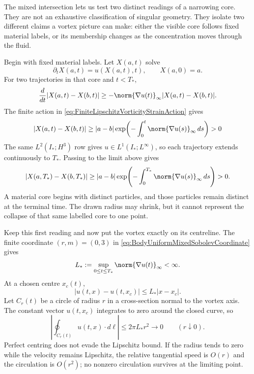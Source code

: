 The mixed intersection lets us test two distinct readings of a narrowing core.
They are not an exhaustive classification of singular geometry.
They isolate two different claims a vortex picture can make: either the visible core follows fixed material labels, or its membership changes as the concentration moves through the fluid.

Begin with fixed material labels.
Let \(X(a,t)\) solve
\[
  \partial_tX(a,t)=u(X(a,t),t),
  \qquad
  X(a,0)=a.
\]
For two trajectories in that core and \(t<T_*\),
\[
  \frac d{dt}|X(a,t)-X(b,t)|
  \geq
  -\norm{\nabla u(t)}_\infty|X(a,t)-X(b,t)|.
\]
The finite action in \eqref{eq:FiniteLipschitzVorticityStrainAction} gives
\begin{equation}\label{eq:BodyMaterialCoreLowerBound}
  |X(a,t)-X(b,t)|
  \geq
  |a-b|
  \exp\!\left(
    -\int_0^t\norm{\nabla u(s)}_\infty\,ds
  \right)
  >0
\end{equation}
The same \(L^2(I_*;H^3)\) row gives \(u\in L^1(I_*;L^\infty)\), so each trajectory
extends continuously to \(T_*\).  Passing to the limit above gives
\[
  |X(a,T_*)-X(b,T_*)|
  \geq |a-b|\exp\!\left(-\int_0^{T_*}\norm{\nabla u(s)}_\infty\,ds\right)>0.
\]
A material core begins with distinct particles, and those particles remain distinct at
the terminal time.  The drawn radius may shrink, but it cannot represent the collapse of
that same labelled core to one point.

Keep this first reading and now put the vortex exactly on its centreline.
The finite coordinate \((r,m)=(0,3)\) in \eqref{eq:BodyUniformMixedSobolevCoordinate} gives
\begin{equation}\label{eq:BodyUniformLipschitzBound}
  L_*:=\sup_{0\leq t\leq T_*}\norm{\nabla u(t)}_\infty<\infty.
\end{equation}
At a chosen centre \(x_c(t)\),
\[
  |u(t,x)-u(t,x_c)|\leq L_*|x-x_c|.
\]
Let \(C_r(t)\) be a circle of radius \(r\) in a cross-section normal to the vortex axis.
The constant vector \(u(t,x_c)\) integrates to zero around the closed curve, so
\begin{equation}\label{eq:BodyCenteredCirculationBound}
  \left|
    \oint_{C_r(t)}u(t,x)\cdot d\ell
  \right|
  \leq2\pi L_*r^2
  \longrightarrow0
  \qquad(r\downarrow0).
\end{equation}
Perfect centring does not evade the Lipschitz bound.  If the radius tends to zero while
the velocity remains Lipschitz, the relative tangential speed is \(O(r)\) and the
circulation is \(O(r^2)\); no nonzero circulation survives at the limiting point.

